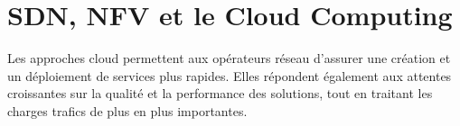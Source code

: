 



\section{SDN, NFV et le Cloud Computing}

Les approches cloud permettent aux opérateurs réseau d'assurer une création et un déploiement de services plus rapides. Elles répondent également aux attentes croissantes sur la qualité et la performance des solutions, tout en traitant les charges trafics de plus en plus importantes.



